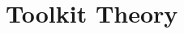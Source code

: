\documentclass{src/manual}
\begin{document}
\renewcommand\FancyVerbFormatLine[1]
{\colorbox{red}{\makebox[\linewidth][l]{
#1}}}

\bibliographyunit[\chapter]

\tableofcontents
\part{Toolkit Theory}


\end{document}
